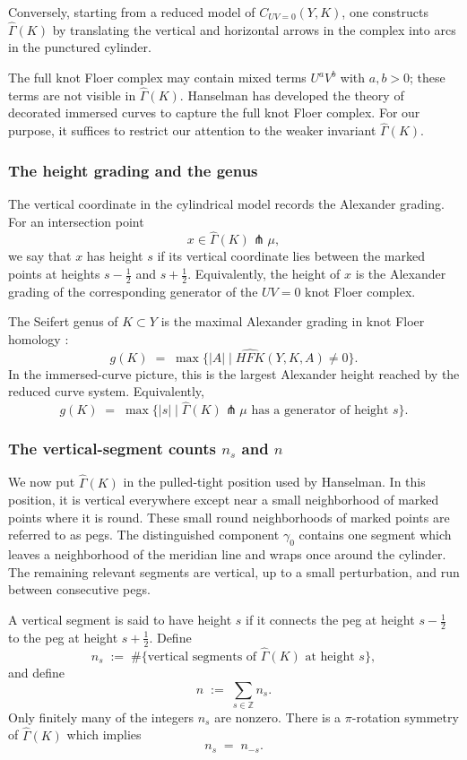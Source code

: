 \documentclass[12pt]{amsart}
\theoremstyle{definition}
\theoremstyle{definition}
\newcommand{\Z}{{\mathbb{Z}}}
\newcommand{\Gh}{\widehat{\Gamma}}
\begin{document}
Conversely, starting from a reduced model of $C_{UV=0}(Y,K)$, one constructs
$\Gh(K)$ by translating the vertical and horizontal arrows in the complex into
arcs in the punctured cylinder.

The full knot Floer complex may contain mixed
terms $U^aV^b$ with $a,b>0$; these terms are not visible in $\Gh(K)$. Hanselman \cite{OSzKnotInvariants} has developed the theory of decorated immersed curves to capture the full knot Floer complex. For our purpose, it suffices to restrict our attention to the weaker invariant $\Gh(K)$.

\subsubsection*{The height grading and the genus}

The vertical coordinate in the cylindrical model records the Alexander grading.
For an intersection point
\[
x \in \Gh(K)\pitchfork \mu,
\]
we say that $x$ has height $s$ if its vertical coordinate lies between the
marked points at heights $s-\frac12$ and $s+\frac12$. Equivalently, the height
of $x$ is the Alexander grading of the corresponding generator of the
$UV=0$ knot Floer complex.

The Seifert genus of $K \subset Y$ is the maximal Alexander
grading in knot Floer homology \cite{Ozsvth2003HolomorphicDA}:
\[
g(K)
\;=\;
\max\bigl\{|A| \mid \widehat{HFK}(Y,K,A)\neq 0\bigr\}.
\]
In the immersed-curve picture, this is the largest Alexander height reached by
the reduced curve system. Equivalently,
\[
g(K)
\;=\;
\max\bigl\{|s| \mid \Gh(K)\pitchfork \mu
\text{ has a generator of height } s\bigr\}.
\]
\subsubsection*{The vertical-segment counts $n_s$ and $n$}

We now put $\Gh(K)$ in the pulled-tight position used by Hanselman. In this position, it is vertical everywhere except near a small neighborhood of marked points where it is round. These small round neighborhoods of marked points are referred to as pegs. The
distinguished component $\gamma_0$ contains one segment which leaves a
neighborhood of the meridian line and wraps once around the cylinder. The
remaining relevant segments are vertical, up to a small perturbation, and run
between consecutive pegs.

A vertical segment is said to have height $s$ if it connects the peg at height
$s-\frac12$ to the peg at height $s+\frac12$. Define
\[
n_s
\;:=\;
\#\{\text{vertical segments of } \Gh(K) \text{ at height } s\},
\]
and define
\[
n
\;:=\;
\sum_{s\in \Z} n_s.
\]
Only finitely many of the integers $n_s$ are nonzero. There is a $\pi$-rotation symmetry of $\Gh(K)$ which implies
\[
n_s \;=\; n_{-s}.
\]
\end{document}

